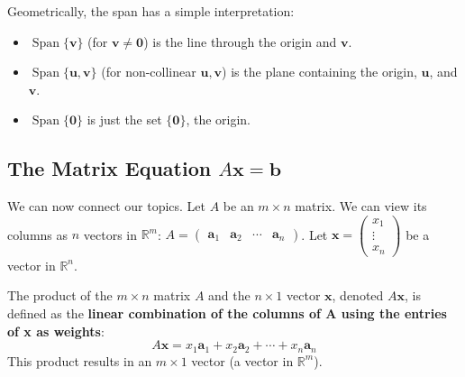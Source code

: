Geometrically, the span has a simple interpretation:
\begin{itemize}
    \item $\operatorname{Span}\{\mathbf{v}\}$ (for $\mathbf{v} \neq \mathbf{0}$) is the line through the origin and $\mathbf{v}$.
    \item $\operatorname{Span}\{\mathbf{u}, \mathbf{v}\}$ (for non-collinear $\mathbf{u}, \mathbf{v}$) is the plane containing the origin, $\mathbf{u}$, and $\mathbf{v}$.
    \item $\operatorname{Span}\{\mathbf{0}\}$ is just the set $\{\mathbf{0}\}$, the origin.
\end{itemize}
%

\subsection{The Matrix Equation \texorpdfstring{$A\mathbf{x}=\mathbf{b}$}{Ax=b}}

We can now connect our topics.
Let $A$ be an $m \times n$ matrix. We can view its columns as $n$ vectors in $\mathbb{R}^m$:
$A = \begin{pmatrix} \mathbf{a}_1 & \mathbf{a}_2 & \cdots & \mathbf{a}_n \end{pmatrix}$.
Let $\mathbf{x} = \begin{pmatrix} x_1 \\ \vdots \\ x_n \end{pmatrix}$ be a vector in $\mathbb{R}^n$.

\begin{definition}
The product of the $m \times n$ matrix $A$ and the $n \times 1$ vector $\mathbf{x}$, denoted $A\mathbf{x}$, is defined as the \textbf{linear combination of the columns of A using the entries of x as weights}:
\[
A\mathbf{x} = x_1\mathbf{a}_1 + x_2\mathbf{a}_2 + \cdots + x_n\mathbf{a}_n
\]
This product results in an $m \times 1$ vector (a vector in $\mathbb{R}^m$).
\end{definition}

